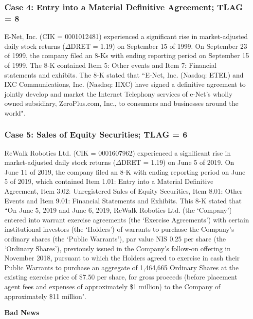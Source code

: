 \subsubsection*{Case 4: Entry into a Material Definitive Agreement; TLAG = 8}
E-Net, Inc. (CIK = 0001012481) experienced a significant rise in market-adjusted daily stock returns ($\Delta$DRET = 1.19) on September 15 of 1999. On September 23 of 1999, the company filed an 8-Ks with ending reporting period on September 15 of 1999. The 8-K contained Item 5: Other events and Item 7: Financial statements and exhibits. The 8-K stated that ``E-Net, Inc. (Nasdaq: ETEL) and IXC Communications, Inc. (Nasdaq: IIXC) have signed a definitive agreement to jointly develop and market the Internet Telephony services of e-Net's wholly owned subsidiary, ZeroPlus.com, Inc., to consumers and businesses around the world".
\subsubsection*{Case 5: Sales of Equity Securities; TLAG = 6}
ReWalk Robotics Ltd. (CIK = 0001607962) experienced a significant rise in market-adjusted daily stock returns ($\Delta$DRET = 1.19) on June 5 of 2019. On June 11 of 2019, the company filed an 8-K with ending reporting period on June 5 of 2019, which contained Item 1.01: Entry into a Material Definitive Agreement, Item 3.02: Unregistered Sales of Equity Securities, Item 8.01: Other Events and Item 9.01: Financial Statements and Exhibits. This 8-K stated that ``On June 5, 2019  and June 6, 2019, ReWalk Robotics Ltd. (the `Company') entered into warrant exercise agreements (the `Exercise Agreements') with certain institutional investors (the `Holders') of warrants to purchase the Company’s ordinary shares (the `Public Warrants'), par value NIS 0.25 per share (the `Ordinary Shares'), previously issued in the Company’s follow-on offering in November 2018, pursuant to which the Holders agreed to exercise in cash their Public Warrants to purchase an aggregate of 1,464,665 Ordinary Shares at the existing exercise price of \$7.50 per share, for gross proceeds (before placement agent fees and expenses of approximately \$1 million) to the Company of approximately \$11 million".

\begin{center}
	\textbf{Bad News}
\end{center}
